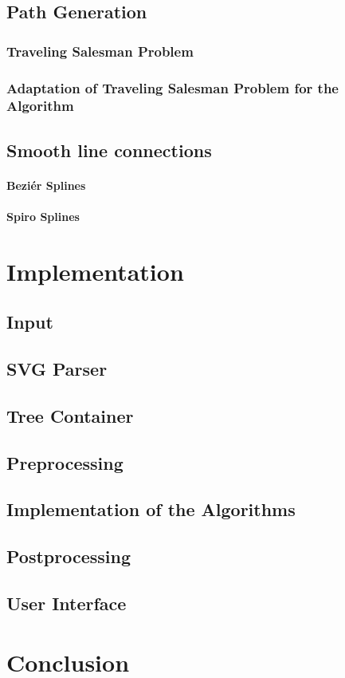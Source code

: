 \documentclass[10pt,twoside,a4paper]{report}
\begin{document}
\section{Path Generation}
\subsection{Traveling Salesman Problem}
\subsection{Adaptation of Traveling Salesman Problem for the Algorithm}

\section{Smooth line connections}
\subsubsection{Beziér Splines}
\subsubsection{Spiro Splines}

\chapter{Implementation}
\section{Input}	%
\section{SVG Parser}
\section{Tree Container}
\section{Preprocessing}
\section{Implementation of the Algorithms}
\section{Postprocessing}
\section{User Interface}

\chapter{Conclusion}
\cleardoublepage

\appendix

\cleardoublepage



\end{document}
